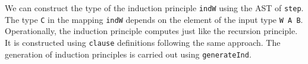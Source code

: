 \documentclass[runningheads]{llncs}
\begin{document}

We can construct the type of the induction principle {\tt indW} using the AST of {\tt step}. The type {\tt C} in the mapping {\tt indW} depends on the element of the input type {\tt W A B}.
Operationally, the induction principle computes just like the recursion principle.
It is constructed using {\tt clause} definitions following the same approach.
The generation of induction principles is carried out using {\tt generateInd}.

\end{document}
